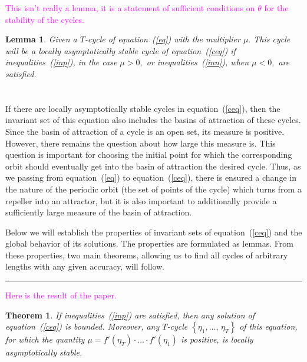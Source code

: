 \documentclass[12pt,a4paper]{amsart}
\newtheorem{theorem}{Theorem}
\newtheorem{lemma}{Lemma}
\begin{document}
\textcolor{magenta}{This isn't really a lemma, it is a statement of sufficient conditions on $\theta$ for the stability of the cycles.}

\begin{lemma}\label{l1}
Given a $T$-cycle of equation~(\ref{eq}) with the multiplier $\mu.$ This cycle will be a locally asymptotically stable cycle of 
equation~(\ref{ceq}) if inequalities~(\ref{inp}), in the case $\mu>0,$ or inequalities~(\ref{inn}), when $\mu<0,$ are satisfied.
\end{lemma}



\section{}

If there are locally asymptotically stable cycles in equation~(\ref{ceq}), then the invariant set of this equation also includes the basins of 
attraction of these cycles. Since the basin of attraction of a cycle is an open set, its measure is positive. However, there remains the question 
about how large this measure is. This question is important for choosing the initial point for which the corresponding orbit should eventually 
get into the basin of attraction the desired cycle. Thus, as we passing from equation~(\ref{eq}) to equation~(\ref{ceq}), there is ensured a change 
in the nature of the periodic orbit (the set of points of the cycle) which turns from a repeller into an attractor, but it is also important 
to additionally provide a sufficiently large measure of the basin of attraction. 

Below we will establish the properties of invariant sets of equation~(\ref{ceq}) and the global behavior of its solutions. 
The properties are formulated as lemmas. From these properties, two main theorems, allowing us to find all cycles of arbitrary 
lengths with any given accuracy, will follow. 

\vskip 12pt
\textcolor{magenta}{\hrule}
\vskip 10pt
\textcolor{magenta}{Here is the result of the paper.}

\begin{theorem}\label{t2}
If inequalities~(\ref{inp}) are satisfied, then any solution of equation~(\ref{ceq}) is bounded. Moreover, any $T$-cycle $\left\{\eta_1,\ldots,\,\eta_T\right\}$ 
of this equation, for which the quantity $\mu = f'(\eta_T)\cdot\ldots\cdot f'(\eta_1)$ is positive, is locally asymptotically stable.
\end{theorem}
\end{document}
